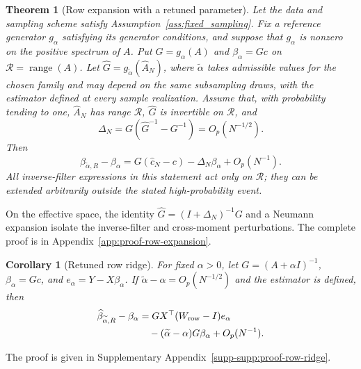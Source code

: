 \documentclass[pdflatex,iicol,sn-mathphys-ay]{sn-jnl}
\theoremstyle{thmstyleone}
\newtheorem{theorem}{Theorem}
\newtheorem{corollary}{Corollary}
\theoremstyle{thmstylethree}
\theoremstyle{thmstyletwo}
\begin{document}
\begin{theorem}[Row expansion with a retuned parameter]\label{thm:row_expansion}
Let the data and sampling scheme satisfy Assumption~\ref{ass:fixed_sampling}.
Fix a reference generator $g_\alpha$ satisfying its generator conditions,
and suppose that $g_\alpha$ is nonzero on the positive spectrum of $A$. Put
$G=g_\alpha(A)$ and $\beta_\alpha=Gc$ on
$\mathcal R=\operatorname{range}(A)$.
Let $\widehat G=g_{\widetilde\alpha}(\widehat A_N)$, where $\widetilde\alpha$
takes admissible values for the chosen family and may depend on the same subsampling draws, with the estimator
defined at every sample realization. Assume that, with probability tending
to one, $\widehat A_N$ has range $\mathcal R$, $\widehat G$ is invertible
on $\mathcal R$, and
\begin{equation*}
 \Delta_N=G(\widehat G^{-1}-G^{-1})=O_p(N^{-1/2}).
\end{equation*}
Then
\begin{equation}\label{eq:row_expansion_general}
 \widehat\beta_{\widetilde\alpha,R}-\beta_\alpha
 =G(\widehat c_N-c)-\Delta_N\beta_\alpha+O_p(N^{-1}).
\end{equation}
All inverse-filter expressions in this statement act only on $\mathcal R$;
they can be extended arbitrarily outside the stated high-probability event.
\end{theorem}
On the effective space, the identity $\widehat G=(I+\Delta_N)^{-1}G$
and a Neumann expansion isolate the inverse-filter and cross-moment
perturbations. The complete proof is in Appendix~\ref{app:proof-row-expansion}.

\begin{corollary}[Retuned row ridge]\label{cor:row_ridge}
For fixed $\alpha>0$, let $G=(A+\alpha I)^{-1}$,
$\beta_\alpha=Gc$, and $e_\alpha=Y-X\beta_\alpha$.
If $\widetilde\alpha-\alpha=O_p(N^{-1/2})$ and the estimator is defined,
then
\begin{equation}\label{eq:row_ridge_expansion}
 \begin{aligned}
 \widehat\beta_{\widetilde\alpha,R}-\beta_\alpha
 &=GX^\top(W_{\rm row}-I)e_\alpha\\
 &\quad -(\widetilde\alpha-\alpha)G\beta_\alpha+O_p(N^{-1}).
 \end{aligned}
\end{equation}
\end{corollary}
The proof is given in Supplementary Appendix~\ref{supp-supp:proof-row-ridge}.
\end{document}
